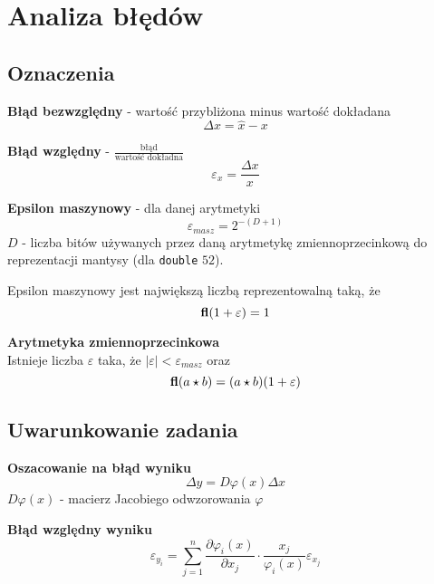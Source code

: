\documentclass[../mn-notatki.tex]{subfiles}
\begin{document}
\section{Analiza błędów}

\subsection{Oznaczenia}

\begin{tcolorbox}
\textbf{Błąd bezwzględny} - wartość przybliżona minus wartość dokładana
\[
\Delta x = \hat{x} - x
\]
\end{tcolorbox}

\begin{tcolorbox}
\textbf{Błąd względny} - $\frac{\text{błąd}}{\text{wartość dokładna}}$
\[
\varepsilon_x = \frac{\Delta x}{x}
\]
\end{tcolorbox}

\begin{tcolorbox}
\textbf{Epsilon maszynowy} - dla danej arytmetyki
\[
\varepsilon_{masz} = 2^{-(D+1)}
\]
$D$ - liczba bitów używanych przez daną arytmetykę zmiennoprzecinkową do
reprezentacji mantysy (dla \texttt{double} $52$).

Epsilon maszynowy jest największą liczbą reprezentowalną taką, że
\[
\textbf{fl}(1 + \varepsilon) = 1
\]
\end{tcolorbox}

\begin{tcolorbox}
\textbf{Arytmetyka zmiennoprzecinkowa}\\
Istnieje liczba $\varepsilon$ taka, że $|\varepsilon| < \varepsilon_{masz}$ oraz
\[
\textbf{fl}(a \star b) = (a \star b)(1 + \varepsilon)
\]
\end{tcolorbox}


\subsection{Uwarunkowanie zadania}

\begin{tcolorbox}
\textbf{Oszacowanie na błąd wyniku}\\
\[
\Delta y = D \varphi(x) \Delta x
\]
$D \varphi(x)$ - macierz Jacobiego odwzorowania $\varphi$
\end{tcolorbox}

\begin{tcolorbox}
\textbf{Błąd względny wyniku}\\
\[
\varepsilon_{y_i} = \sum_{j=1}^{n} \frac{\partial \varphi_i(x)}{\partial x_j}
\cdot \frac{x_j}{\varphi_i(x)} \varepsilon_{x_j}
\]
\end{tcolorbox}
\end{document}

